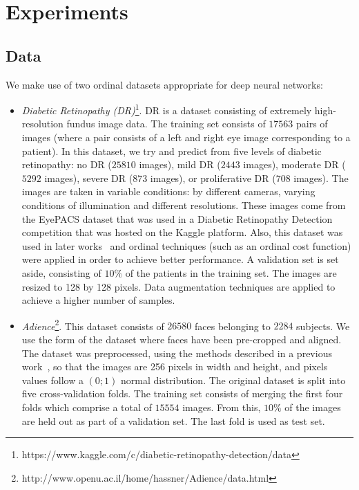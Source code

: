 \documentclass[journal]{IEEEtran}
\begin{document}
	\section{Experiments}
	\label{sect:experiments}
	\subsection{Data}
	We make use of two ordinal datasets appropriate for deep neural networks:
	
	\begin{itemize}
		\item \textit{Diabetic Retinopathy (DR)}\footnote{https://www.kaggle.com/c/diabetic-retinopathy-detection/data}. DR is a dataset consisting of extremely high-resolution fundus image data. The training set consists of $17563$ pairs of images (where a  pair consists of a left and right eye image corresponding to a patient). In this dataset, we try and predict from five levels of diabetic retinopathy: no DR ($25810$ images), mild DR ($2443$ images), moderate DR ($5292$ images), severe DR ($873$ images), or proliferative DR ($708$ images). The images are taken in variable conditions: by different cameras,  varying conditions of illumination and different resolutions. These images come from the EyePACS dataset that was used in a Diabetic Retinopathy Detection competition that was hosted on the Kaggle platform. Also, this dataset was used in later works~\cite{de2018weighted, nebot2016diabetic} and ordinal techniques (such as an ordinal cost function) were applied in order to achieve better performance. A validation set is set aside, consisting of $10\%$ of the patients in the training set. The images are resized to 128 by 128 pixels. Data augmentation techniques are applied to achieve a higher number of samples.
		
		\item \textit{Adience}\footnote{http://www.openu.ac.il/home/hassner/Adience/data.html}. This dataset consists of $26580$ faces belonging to $2284$ subjects. We use the form of the dataset where faces have been pre-cropped and aligned. The dataset was preprocessed, using the methods described in a previous work~\cite{beckham2017unimodal}, so that the images are 256 pixels in width and height, and pixels values follow a $(0;1)$ normal distribution. The original dataset is split into five cross-validation folds. The training set consists of merging the first four folds which comprise a total of $15554$ images. From this, $10\%$ of the images are held out as part of a validation set. The last fold is used as test set.
	\end{itemize}
	
\end{document}
